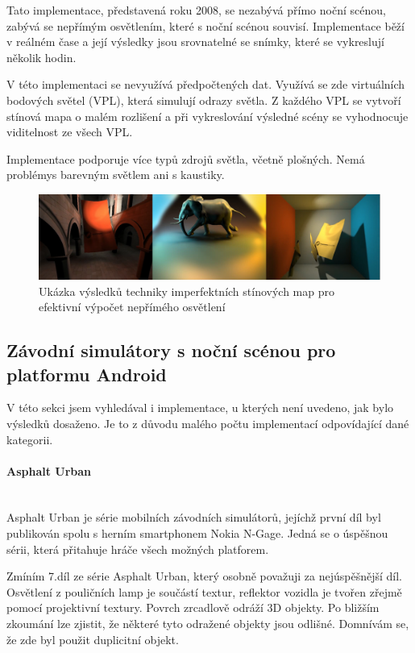 \documentclass[11pt,twoside,a4paper]{book}
\begin{document}
Tato implementace, představená roku 2008, se nezabývá přímo noční scénou, zabývá se nepřímým osvětlením, které s noční scénou souvisí. Implementace běží v reálném čase a její výsledky jsou srovnatelné se snímky, které se vykreslují několik hodin.

V této implementaci se nevyužívá předpočtených dat. Využívá se zde virtuálních bodových světel (VPL), která simulují odrazy světla. Z každého VPL se vytvoří stínová mapa o malém rozlišení a při vykreslování výsledné scény se vyhodnocuje viditelnost ze všech VPL.

Implementace podporuje více typů zdrojů světla, včetně plošných. Nemá problémy\linebreak s barevným světlem ani s kaustiky.

\begin{figure}[h!]
\begin{center}
\includegraphics[width=150mm]{figures/ISM.png}
\caption{Ukázka výsledků techniky imperfektních stínových map pro efektivní výpočet nepřímého osvětlení \cite{Ritschel:2008:ISM}}
\end{center}
\end{figure}
\newpage

\subsection{Závodní simulátory s noční scénou pro platformu Android}
V této sekci jsem vyhledával i implementace, u kterých není uvedeno, jak bylo výsledků dosaženo. Je to z důvodu malého počtu implementací odpovídající dané kategorii.

\paragraph{Asphalt Urban}\mbox{}\\

Asphalt Urban je série mobilních závodních simulátorů, jejíchž první díl byl publikován spolu s herním smartphonem Nokia N-Gage. Jedná se o úspěšnou sérii, která přitahuje hráče všech možných platforem.

Zmíním 7.díl ze série Asphalt Urban, který osobně považuji za nejúspěšnější díl. Osvětlení z pouličních lamp je součástí textur, reflektor vozidla je tvořen zřejmě pomocí projektivní textury. Povrch zrcadlově odráží 3D objekty. Po bližším zkoumání lze zjistit, že některé tyto odražené objekty jsou odlišné. Domnívám se, že zde byl použit duplicitní objekt.
\end{document}

